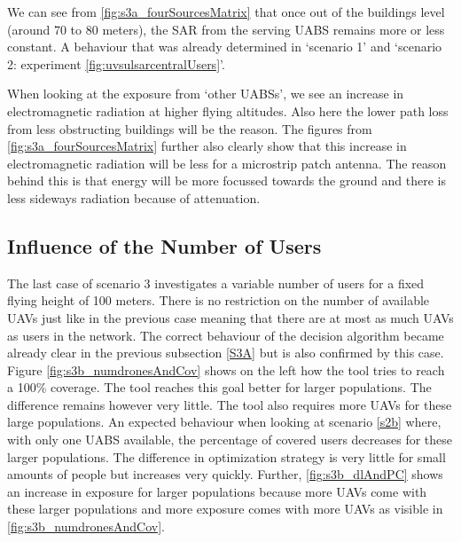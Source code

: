 We can see from \ref{fig:s3a_fourSourcesMatrix} that once out of the buildings level (around 70 to 80 meters), the SAR from the serving \gls{UABS} remains 
more or less constant. A behaviour that was already determined in `scenario 1' and `scenario 2: experiment \ref{fig:uvsulsarcentralUsers}'. 

When looking at the exposure from `other \gls{UABS}s', we see an increase in electromagnetic radiation at higher 
flying altitudes.
Also here the lower path loss from less obstructing buildings will be the reason.
The figures from \ref{fig:s3a_fourSourcesMatrix} further also clearly show that this increase 
in electromagnetic radiation will be less for a microstrip patch antenna. The reason behind this is that energy 
will be more focussed towards the ground and there is less sideways radiation because of attenuation.


\FloatBarrier
\subsection{Influence of the Number of Users}
\label{S3B}

The last case of scenario 3 investigates a variable number of users for a fixed flying height of 100 meters. There is no 
restriction on the number of available \gls{UAV}s just like in the previous case meaning that there are at most 
as much \gls{UAV}s as users in the network. The correct behaviour of the decision algorithm became already clear in the previous subsection \ref{S3A} but is also
confirmed by this case.
Figure \ref{fig:s3b_numdronesAndCov} shows on the left how the tool tries to reach a 100\% coverage. The tool reaches this goal 
better for larger populations. The difference remains however very little. The tool also requires more \gls{UAV}s for these large 
populations. An expected behaviour  when looking at scenario \ref{s2b} where, with only one \gls{UABS} available, the percentage of covered users decreases for these larger populations.
 The difference in optimization strategy is very little for small amounts of people but increases very quickly. Further, \ref{fig:s3b_dlAndPC} shows an increase 
 in exposure for larger populations because more \gls{UAV}s come with these larger populations and more 
 exposure comes with more \gls{UAV}s as visible in \ref{fig:s3b_numdronesAndCov}.

